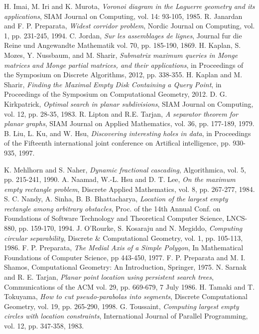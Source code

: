 \documentclass[12pt]{llncs}
\begin{document}
\begin{thebibliography}{88}
 H. Imai, M. Iri and K. Murota, {\it Voronoi diagram
in the Laguerre geometry and its applications}, {\sf SIAM Journal on
Computing}, vol. 14: 93-105, 1985.
 R. Janardan and F. P. Preparata, {\it Widest  
corridor problem}, {\sf Nordic Journal on Computing}, vol. 1, 
pp. 231-245, 1994.
 C. Jordan, {\it Sur les assemblages de lignes}, {\sf 
Journal fur die Reine und Angewandte Mathematik} vol. 70, pp. 185-190,
1869.
 H. Kaplan, S. Mozes, Y. Nussbaum, and M. Sharir, {\it Submatrix maximum queries in Monge matrices and Monge partial matrices, and their applications}, in {\sf Proceedings of the Symposium on Discrete Algorithms}, 2012,  pp. 338-355.
 H. Kaplan and M. Sharir, {\it Finding the Maximal Empty Disk Containing a Query Point}, in {\sf Proceedings of the Symposium on Computational Geometry}, 2012.
 D. G. Kirkpatrick, {\it Optimal search in planar
subdivisions}, {\sf SIAM Journal on Computing}, vol. 12, pp. 28-35,
1983.
 R. Lipton and R.E. Tarjan, {\it A separator theorem for 
planar graphs}, {\sf SIAM Journal on Applied Mathematics},
vol. 36, pp. 177-189, 1979.
 B. Liu, L. Ku, and W. Hsu, {\it Discovering interesting holes in data}, in {\sf Proceedings of the Fifteenth international joint conference on Artifical intelligence}, pp. 930-935, 1997.

 K. Mehlhorn and S. Naher, {\it  Dynamic fractional
cascading}, {\sf Algorithmica}, vol. 5, pp. 215-241, 1990.
 A. Naamad, W.-L. Hsu and D. T. Lee,  {\it On the 
maximum empty rectangle problem}, {\sf Discrete Applied 
Mathematics}, vol. 8, pp. 267-277, 1984.
 S. C. Nandy, A. Sinha, B. B. Bhattacharya, {\it 
Location of the largest empty rectangle among arbitrary obstacles}, 
Proc. of the {\sf 14th Annual Conf. on Foundations of Software
Technology 
and Theoretical Computer Science}, LNCS-880, pp. 159-170, 1994.
 J. O'Rourke, S. Kosaraju and N. Megiddo, {\it 
Computing circular separability}, {\sf Discrete \& Computational 
Geometry}, vol. 1, pp. 105-113, 1986.
 F. P. Preparata, {\it The Medial Axis of a Simple Polygon}, In {\sf Mathematical Foundations of Computer Science}, pp 443-450, 1977.
 F. P. Preparata and M. I. Shamos, {\sf Computational
Geometry: An Introduction}, Springer, 1975.
 N. Sarnak and R. E. Tarjan, {\it Planar point
location using persistent search trees}, {\sf Communications of the
ACM} vol. 29, pp. 669-679, 7 July 1986.
 H. Tamaki and T. Tokuyama, {\it How to cut
pseudo-parabolas into segments}, {\sf Discrete
Computational Geometry}, vol. 19, pp. 265-290, 1998.
 G. Toussaint, {\it  Computing largest empty circles with
location constraints}, {\sf International Journal of Parallel
Programming}, vol. 12, pp. 347-358, 1983.
\end{thebibliography}
\end{document}
